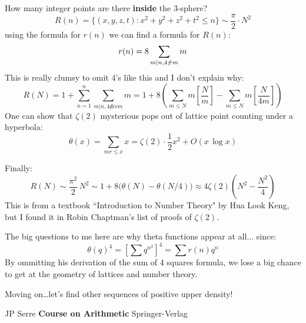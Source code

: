 \documentclass[12pt]{article}
\begin{document}
\noindent How many integer points are there {\color{black!90!white}\textbf{inside}} the 3-sphere?
$$ R(n)=\{ (x,y,z,t): x^2 + y^2 + z^2 + t^2 \leq n \} \sim \frac{\pi}{2}\cdot N^2 $$
using the formula for $r(n)$ we can find a formula for $R(n)$:
$$ r(n) = 8 \sum_{m|n, 4 \not \div m} m$$
This is really clumsy to omit 4's like this and I don't explain why:
$$ 
R(N) = 1 + \sum_{n=1}^n \sum_{m|n, 4 \not div m} m
= 1 + 8 \left( \sum_{m \leq N} m \left[\frac{N}{m}\right] 
-  \sum_{m \leq N} m \left[\frac{N}{4m}\right] \right)
$$
One can show that $\zeta(2)$ mysterious pops out of lattice point counting under a hyperbola:
$$ \theta(x) = \sum_{mr \leq x} x = 
\zeta(2) \cdot \frac{1}{2}x^2 + O(x \, \log x)$$

\newpage

\noindent Finally:
$$ R(N) \sim \frac{\pi^2}{2} \, N^2 
\sim 1 + 8 \big( \theta(N) - \theta(N/4) \big)
\approx 4 \zeta(2) \left( N^2 - \frac{N^2}{4} \right)$$
This is from a textbook ``Introduction to Number Theory" by Hua Look Keng, but I found it in Robin Chaptman's list of proofs of $\zeta(2)$. \newline

\noindent The big questions to me here are why theta functions appear at all... since:
$$ \theta(q)^4 = \left[ \sum q^{n^2} \right]^4 
= \sum r(n) q^n $$
By ommitting his derivation of the sum of 4 squares formula, we lose a big chance to get at the geometry of lattices and number theory. \newline

\noindent Moving on\dots let's find other sequences of positive upper density!

\newpage

\selectfont \fontsize{12}{10}\selectfont

\begin{thebibliography}{}

\item JP Serre \textbf{Course on Arithmetic} Springer-Verlag




\end{thebibliography}
\end{document}
